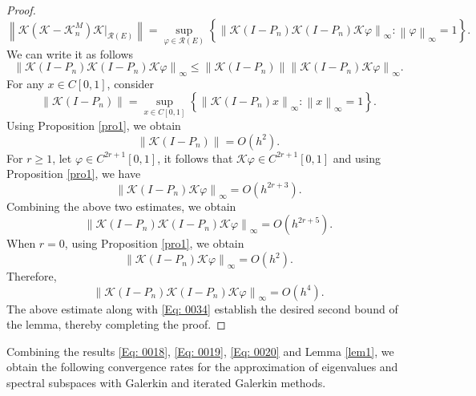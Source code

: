 \documentclass[pdflatex, sn-mathphys-num]{sn-jnl}%
\newcommand{\norm}[1]{\left\lVert #1\right\rVert}
\theoremstyle{thmstyleone}%
\theoremstyle{thmstyletwo}%
\theoremstyle{thmstylethree}%
\begin{document}
\begin{proof}
\begin{equation*}
		\norm{\mathcal{K}(\mathcal{K} - \mathcal{K}_n^M) \mathcal{K} |_{\mathcal{R}(E)}} 
		= \sup_{\varphi \in \mathcal{R}(E)}\left\{\norm{ \mathcal{K} (I - P_n) \mathcal{K}(I - P_n)\mathcal{K}\varphi}_\infty : \norm{\varphi}_\infty =1 \right\}.
	\end{equation*}
	We can write it as follows
	\begin{equation*}
		\norm{\mathcal{K}(I - P_n) \mathcal{K}(I - P_n)\mathcal{K}\varphi}_\infty \leq\norm{\mathcal{K}(I - P_n)} \norm{\mathcal{K}(I - P_n)\mathcal{K}\varphi}_\infty.
	\end{equation*}
	For any \(x \in C[0,1]\), consider
	\begin{equation*}
		\norm{\mathcal{K}(I - P_n)} = \sup_{x \in C[0,1]}\left\{ \norm{\mathcal{K}(I - P_n)x}_\infty : \norm{x}_\infty =1 \right\}.
	\end{equation*}
	Using Proposition \ref{pro1}, we obtain
	\begin{equation*}
		\norm{\mathcal{K}(I - P_n)} = O\left(h^{2} \right).
	\end{equation*}
	For \(r \geq 1\), let \(\varphi \in C^{2r+1}[0,1]\), it follows that \(\mathcal{K}\varphi \in C^{2r+1}[0,1]\) and using Proposition \ref{pro1}, we have
	\begin{equation*}
		\norm{\mathcal{K}(I - P_n)\mathcal{K}\varphi}_\infty = O\left(h^{2r +3}\right).
	\end{equation*}
	Combining the above two estimates, we obtain 
	\begin{equation}  \label{Eq: 0034}
		\norm{\mathcal{K}(I - P_n) \mathcal{K}(I - P_n)\mathcal{K}\varphi}_\infty = 	O\left(h^{2r+5}\right).
	\end{equation}
	When \(r=0\), using Proposition \ref{pro1}, we obtain
	\begin{equation*}
		\norm{\mathcal{K}(I - P_n)\mathcal{K}\varphi}_\infty = O\left(h^{2}\right).
	\end{equation*}
	Therefore,
	\begin{equation*} 
		\norm{\mathcal{K}(I - P_n) \mathcal{K}(I - P_n)\mathcal{K}\varphi}_\infty = 	O\left(h^{4}\right).
	\end{equation*}
	The above estimate along with \eqref{Eq: 0034} establish the desired second bound of the lemma, thereby completing the proof.
\end{proof}
Combining the results \eqref{Eq: 0018}, \eqref{Eq: 0019}, \eqref{Eq: 0020} and Lemma \ref{lem1}, we obtain the following convergence rates for the approximation of eigenvalues and spectral subspaces with Galerkin and iterated Galerkin methods.
\end{document}
